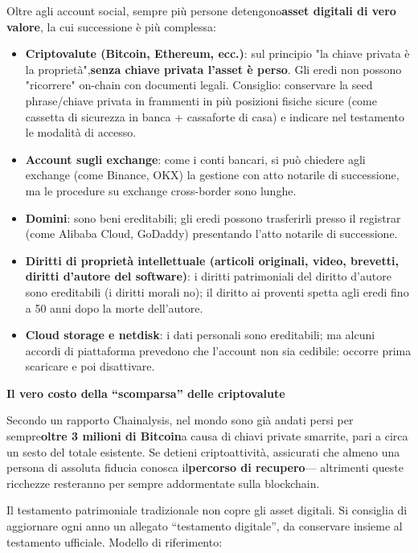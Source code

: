 
Oltre agli account social, sempre più persone detengono\textbf{asset digitali di vero valore}, la cui successione è più complessa:

\begin{itemize}
  \item \textbf{Criptovalute (Bitcoin, Ethereum, ecc.)}: sul principio "la chiave privata è la proprietà",\textbf{senza chiave privata l'asset è perso}. Gli eredi non possono "ricorrere" on-chain con documenti legali. Consiglio: conservare la seed phrase/chiave privata in frammenti in più posizioni fisiche sicure (come cassetta di sicurezza in banca + cassaforte di casa) e indicare nel testamento le modalità di accesso.
  \item \textbf{Account sugli exchange}: come i conti bancari, si può chiedere agli exchange (come Binance, OKX) la gestione con atto notarile di successione, ma le procedure su exchange cross-border sono lunghe.
  \item \textbf{Domini}: sono beni ereditabili; gli eredi possono trasferirli presso il registrar (come Alibaba Cloud, GoDaddy) presentando l'atto notarile di successione.
  \item \textbf{Diritti di proprietà intellettuale (articoli originali, video, brevetti, diritti d'autore del software)}: i diritti patrimoniali del diritto d'autore sono ereditabili (i diritti morali no); il diritto ai proventi spetta agli eredi fino a 50 anni dopo la morte dell'autore.
  \item \textbf{Cloud storage e netdisk}: i dati personali sono ereditabili; ma alcuni accordi di piattaforma prevedono che l'account non sia cedibile: occorre prima scaricare e poi disattivare.
\end{itemize}

\textbf{Il vero costo della “scomparsa” delle criptovalute}\par

Secondo un rapporto Chainalysis, nel mondo sono già andati persi per sempre\textbf{oltre 3 milioni di Bitcoin}a causa di chiavi private smarrite, pari a circa un sesto del totale esistente. Se detieni criptoattività, assicurati che almeno una persona di assoluta fiducia conosca il\textbf{percorso di recupero}— altrimenti queste ricchezze resteranno per sempre addormentate sulla blockchain.


Il testamento patrimoniale tradizionale non copre gli asset digitali. Si consiglia di aggiornare ogni anno un allegato “testamento digitale”, da conservare insieme al testamento ufficiale. Modello di riferimento:

